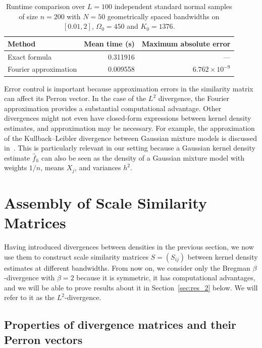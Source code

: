 \begin{table}[htbp]
    \centering
    \begin{tabular}{lrr}
        \hline
        Method & Mean time (s) & Maximum absolute error\\
        \hline
        Exact formula & 0.311916 & ---\\
        Fourier approximation & 0.009558 & $6.762\times 10^{-9}$\\
        \hline
    \end{tabular}
    \caption{Runtime comparison over $L=100$ independent standard normal samples of size $n=200$ with $N=50$ geometrically spaced bandwidths on $[0.01,2]$, $\Omega_0=450$ and $K_0=1376$.}
    \label{tab:exact_fourier_gram_runtime}
\end{table}

Error control is important because approximation errors in the similarity matrix can affect its Perron vector. In the case of the $L^2$ divergence, the Fourier approximation provides a substantial computational advantage. Other divergences might not even have closed-form expressions between kernel density estimates, and approximation may be necessary. For example, the approximation of the Kullback--Leibler divergence between Gaussian mixture models is discussed in~\cite{hershey_approximating_2007}. This is particularly relevant in our setting because a Gaussian kernel density estimate $\hat{f}_h$ can also be seen as the density of a Gaussian mixture model with weights $1/n$, means $X_j$, and variances $h^2$.

\section{Assembly of Scale Similarity Matrices}\label{sec:assembly_of_scale_sim_matrices}

Having introduced divergences between densities in the previous section, we now use them to construct scale similarity matrices $S=(S_{ij})$ between kernel density estimates at different bandwidths. From now on, we consider only the Bregman $\beta$-divergence with $\beta=2$ because it is symmetric, it has computational advantages, and we will be able to prove results about it in Section~\ref{sec:res_2} below. We will refer to it as the $L^2$-divergence.

\subsection{Properties of divergence matrices and their Perron vectors}

